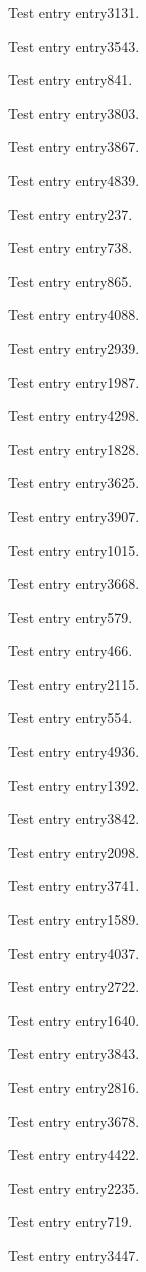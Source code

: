 Test entry \gls{entry3131}.

Test entry \gls{entry3543}.

Test entry \gls{entry841}.

Test entry \gls{entry3803}.

Test entry \gls{entry3867}.

Test entry \gls{entry4839}.

Test entry \gls{entry237}.

Test entry \gls{entry738}.

Test entry \gls{entry865}.

Test entry \gls{entry4088}.

Test entry \gls{entry2939}.

Test entry \gls{entry1987}.

Test entry \gls{entry4298}.

Test entry \gls{entry1828}.

Test entry \gls{entry3625}.

Test entry \gls{entry3907}.

Test entry \gls{entry1015}.

Test entry \gls{entry3668}.

Test entry \gls{entry579}.

Test entry \gls{entry466}.

Test entry \gls{entry2115}.

Test entry \gls{entry554}.

Test entry \gls{entry4936}.

Test entry \gls{entry1392}.

Test entry \gls{entry3842}.

Test entry \gls{entry2098}.

Test entry \gls{entry3741}.

Test entry \gls{entry1589}.

Test entry \gls{entry4037}.

Test entry \gls{entry2722}.

Test entry \gls{entry1640}.

Test entry \gls{entry3843}.

Test entry \gls{entry2816}.

Test entry \gls{entry3678}.

Test entry \gls{entry4422}.

Test entry \gls{entry2235}.

Test entry \gls{entry719}.

Test entry \gls{entry3447}.

